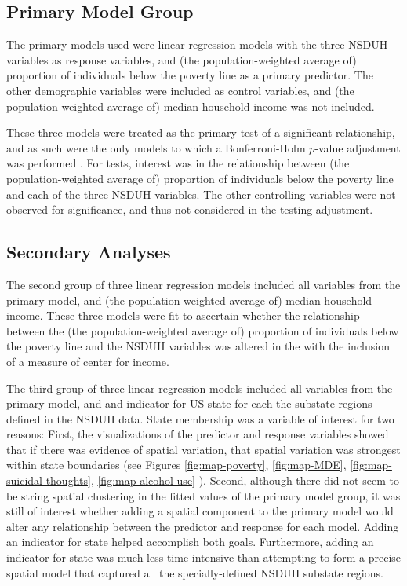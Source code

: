 \documentclass{article}
\begin{document}
\subsection{Primary Model Group}

The primary models used were linear regression models with the three NSDUH
variables as response variables, and
(the population-weighted average of)
proportion of individuals below the poverty line as a primary predictor.
The other demographic variables were included as control variables,
and
(the population-weighted average of)
median household income was not included.

These three models were treated as the primary test
of a significant relationship,
and as such were the only models to which a Bonferroni-Holm
$p$-value adjustment was performed \cite{holm}.
For tests, interest was in the relationship between
(the population-weighted average of)
proportion of individuals below the poverty line
and each of the three NSDUH variables.
The other controlling variables were not
observed for significance,
and thus not considered in the testing adjustment.


\subsection{Secondary Analyses}

The second group of three linear regression models included all variables
from the primary model,
and
(the population-weighted average of)
median household income.
These three models were fit to ascertain whether
the relationship between the
(the population-weighted average of)
proportion of individuals below the poverty line
and the NSDUH variables was altered in the
with the inclusion of a measure of center for income.

The third group of three linear regression models included all variables
from the primary model,
and and indicator for US state for each the
substate regions defined in the NSDUH data.
State membership was a variable of interest for two
reasons:
First, the visualizations of the predictor and response variables
showed that if there was evidence of spatial variation,
that spatial variation was strongest within state boundaries
(see Figures
\ref{fig:map-poverty},
\ref{fig:map-MDE},
\ref{fig:map-suicidal-thoughts},
\ref{fig:map-alcohol-use}
).
Second, although there did not seem to be string spatial
clustering in the fitted values of the primary model group,
it was still of interest whether adding a spatial component to
the primary model would alter any relationship between
the predictor and response for each model.
Adding an indicator for state helped accomplish both goals.
Furthermore, adding an indicator for state was much less
time-intensive than attempting to form a precise spatial model
that captured all the specially-defined NSDUH substate regions.
\end{document}
